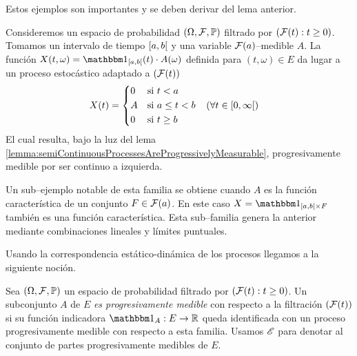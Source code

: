 Estos ejemplos son importantes y se deben derivar del lema anterior.
\begin{example}
  \label{example:basicProgressiveProcess}
  Consideremos un espacio de probabilidad \((\Omega, \mathcal{F}, \mathbb{P})\) filtrado por \((\mathcal{F}(t) : t \geq 0)\).
  Tomamos un intervalo de tiempo \(\interval{co}{a}{b}\) y una variable \(\mathcal{F}(a)\)--medible \(A\).
  La función 
  \(X(t, \omega) = \characteristic_{\interval{co}{a}{b}}(t) \cdot A(\omega)\) definida para \((t, \omega) \in E\)
  da lugar a un proceso estocástico adaptado a \((\mathcal{F}(t))\)
  \begin{align}
    &X(t)
    =
    \left\{\begin{aligned}
      & 0
        && \text{si } t < a
      \\
      & A
      && \text{si } a \leq t < b
      \\
      & 0
        && \text{si } t \geq b
    \end{aligned}\right.
    && (\forall t \in \interval{co}{0}{\infty})
  \end{align}
  El cual resulta, bajo la luz del lema \ref{lemma:semiContinuousProcessesAreProgressivelyMeasurable}, progresivamente medible por ser continuo a izquierda.

  Un sub--ejemplo notable de esta familia se obtiene cuando \(A\) es la función característica de un conjunto \(F \in \mathcal{F}(a)\).
  En este caso \(X = \characteristic_{\interval{co}{a}{b} \times F}\) también es una función característica.
  Esta sub--familia genera la anterior mediante combinaciones lineales y límites puntuales.
\end{example}


Usando la correspondencia estático-dinámica de los procesos llegamos a la siguiente noción. 
\begin{definition}
  Sea \((\Omega, \mathcal{F}, \mathbb{P})\) un espacio de probabilidad filtrado por \((\mathcal{F}(t) : t \geq 0)\).
  Un subconjunto \(A\) de \(E\) \emph{es progresivamente medible} con respecto a la filtración \((\mathcal{F}(t))\) si su función indicadora \(\characteristic_A : E \rightarrow \realNumbers\) queda identificada con un proceso progresivamente medible con respecto a esta familia.
  Usamos \(\mathscr{E}\) para denotar al conjunto de partes progresivamente medibles de \(E\).
\end{definition}

